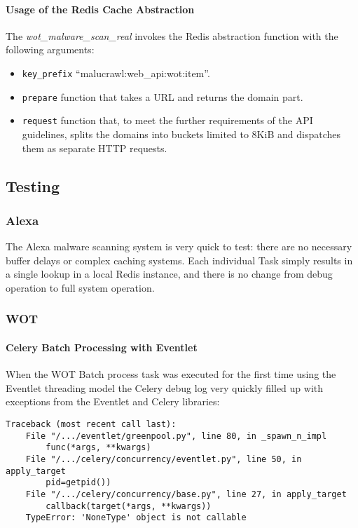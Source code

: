 \paragraph{Usage of the Redis Cache Abstraction}
The \emph{wot\_malware\_scan\_real} invokes the Redis abstraction function with the following arguments:
\begin{itemize}
    \item \verb`key_prefix` ``malucrawl:web\_api:wot:{item}''.
    \item \verb`prepare` function that takes a URL and returns the domain part.
    \item \verb`request` function that, to meet the further requirements of the API guidelines, splits the domains into buckets limited to 8KiB and dispatches them as separate HTTP requests.
\end{itemize}

\subsection{Testing}
\subsubsection{Alexa}
The Alexa malware scanning system is very quick to test: there are no necessary buffer delays or complex caching systems. Each individual Task simply results in a single lookup in a local Redis instance, and there is no change from debug operation to full system operation.

\subsubsection{WOT}
\paragraph{Celery Batch Processing with Eventlet}
When the WOT Batch process task was executed for the first time using the Eventlet threading model the Celery debug log very quickly filled up with exceptions from the Eventlet and Celery libraries:

\begin{verbatim}
Traceback (most recent call last):
    File "/.../eventlet/greenpool.py", line 80, in _spawn_n_impl
        func(*args, **kwargs)
    File "/.../celery/concurrency/eventlet.py", line 50, in apply_target
        pid=getpid())
    File "/.../celery/concurrency/base.py", line 27, in apply_target
        callback(target(*args, **kwargs))
    TypeError: 'NoneType' object is not callable
\end{verbatim}

